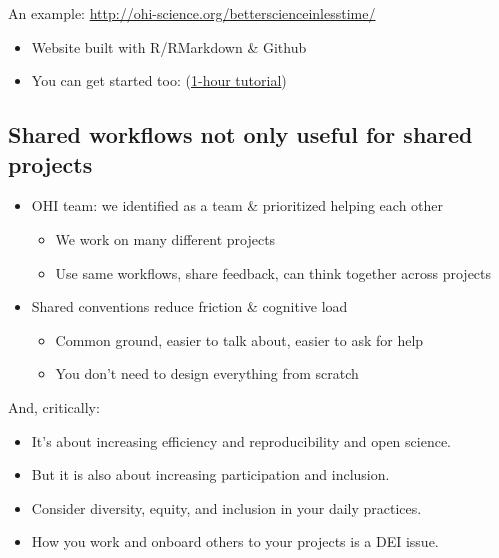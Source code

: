 \documentclass[
  letterpaper,
  DIV=11,
  numbers=noendperiod]{scrreprt}
\providecommand{\tightlist}{%
  \setlength{\itemsep}{0pt}\setlength{\parskip}{0pt}}
\begin{document}
An example: \url{http://ohi-science.org/betterscienceinlesstime/}

\begin{itemize}
\tightlist
\item
  Website built with R/RMarkdown \& Github\\
\item
  You can get started too:
  (\href{https://jules32.github.io/rmarkdown-website-tutorial/}{1-hour
  tutorial})
\end{itemize}

\hypertarget{shared-workflows-not-only-useful-for-shared-projects}{%
\subsection{Shared workflows not only useful for shared
projects}\label{shared-workflows-not-only-useful-for-shared-projects}}

\begin{itemize}
\tightlist
\item
  OHI team: we identified as a team \& prioritized helping each other

  \begin{itemize}
  \tightlist
  \item
    We work on many different projects
  \item
    Use same workflows, share feedback, can think together across
    projects
  \end{itemize}
\item
  Shared conventions reduce friction \& cognitive load

  \begin{itemize}
  \tightlist
  \item
    Common ground, easier to talk about, easier to ask for help
  \item
    You don't need to design everything from scratch
  \end{itemize}
\end{itemize}

And, critically:

\begin{itemize}
\tightlist
\item
  It's about increasing efficiency and reproducibility and open science.
\item
  But it is also about increasing participation and inclusion.
\item
  Consider diversity, equity, and inclusion in your daily practices.
\item
  How you work and onboard others to your projects is a DEI issue.
\end{itemize}
\end{document}
